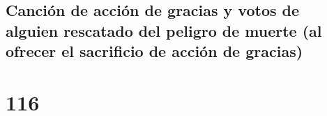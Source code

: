 \hypertarget{canciuxf3n-de-acciuxf3n-de-gracias-y-votos-de-alguien-rescatado-del-peligro-de-muerte-al-ofrecer-el-sacrificio-de-acciuxf3n-de-gracias}{%
\subsection{Canción de acción de gracias y votos de alguien rescatado
del peligro de muerte (al ofrecer el sacrificio de acción de
gracias)}\label{canciuxf3n-de-acciuxf3n-de-gracias-y-votos-de-alguien-rescatado-del-peligro-de-muerte-al-ofrecer-el-sacrificio-de-acciuxf3n-de-gracias}}

\hypertarget{section-113}{%
\section{116}\label{section-113}}

